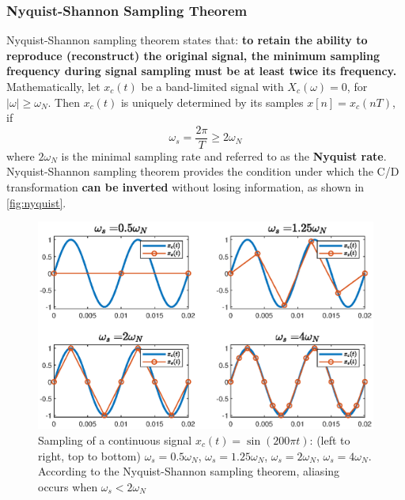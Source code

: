 \subsubsection{Nyquist-Shannon Sampling Theorem}
Nyquist-Shannon sampling theorem states that: \textbf{to retain the ability to reproduce (reconstruct) the original signal, the minimum sampling frequency during signal sampling must be at least twice its frequency.}\\

Mathematically, let $x_{c}(t)$ be a band-limited signal with $X_{c}(\omega)=0$, for $\lvert \omega \rvert \geq \omega_{N}$. Then $x_{c}(t)$ is uniquely determined by its samples $x[n] = x_{c}(nT)$, if 
\[ \omega_{s}=\frac{2\pi}{T} \geq 2\omega_{N} \]
where $2\omega_{N}$ is the minimal sampling rate and referred to as the \textbf{Nyquist rate}.\\

Nyquist-Shannon sampling theorem provides the condition under which the C/D transformation \textbf{can be inverted} without losing information, as shown in \autoref{fig:nyquist}.

\begin{figure}[H]
    \centering
    \includegraphics[width=.95\textwidth, center]{images/nyquist.eps}
    \caption{Sampling of a continuous signal $x_{c}(t)=\sin(200\pi t)$: (left to right, top to bottom) $\omega_{s}=0.5\omega_{N}$, $\omega_{s}=1.25\omega_{N}$, $\omega_{s}=2\omega_{N}$, $\omega_{s}=4\omega_{N}$. According to the Nyquist-Shannon sampling theorem, aliasing occurs when $\omega_{s} < 2\omega_{N}$}
    \label{fig:nyquist}
\end{figure}

